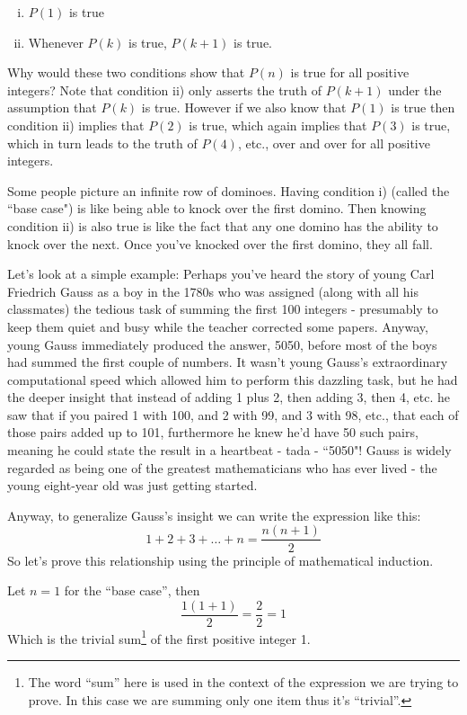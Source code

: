 \documentclass{article}
\begin{document}
\begin{enumerate}[i)]
\item $P(1)$ is true
\item Whenever $P(k)$ is true, $P(k+1)$ is true.
\end{enumerate}

Why would these two conditions show that $P(n)$ is true for all
positive integers? Note that condition ii) only asserts the truth
of $P(k+1)$ under the assumption that $P(k)$ is true.
However if we also know that $P(1)$ is true then condition ii) implies that $P(2)$ is true,
which again implies that $P(3)$ is true,
which in turn leads to the truth of $P(4)$,
etc., over and over for all positive integers.

Some people picture an infinite row of dominoes.
Having condition i) (called the ``base case") is like being
able to knock over the first domino.
Then knowing condition ii) is also true is like the
fact that any one domino has the ability to knock over the next.
Once you've knocked over the first domino,
they all fall.

Let's look at a simple example:
Perhaps you've heard the story of young Carl Friedrich Gauss
as a boy in
the 1780s who was assigned (along with all his classmates)
the tedious task of summing the first 100 integers -
presumably to keep them quiet and busy while the
teacher corrected some papers. Anyway,
young Gauss immediately produced the answer,
5050, before most of the boys had summed the first couple of numbers.
It wasn't young Gauss's extraordinary computational speed which allowed
him to perform this dazzling task,
but he had the deeper insight that instead of adding 1 plus 2,
then adding 3, then 4, etc.
he saw that if you paired 1 with 100,
and 2 with 99,
and 3 with 98,
etc.,
that each of those pairs added up to 101,
furthermore he knew he'd have 50 such pairs,
meaning he could state the result in a heartbeat - tada - ``5050"!
Gauss is widely regarded as being one of the greatest
mathematicians who has ever lived - the young eight-year old was just getting started.

\break
Anyway,
to generalize Gauss's insight we can write the expression like this:
\[1+2+3+\ldots+n=\frac{n(n+1)}{2}\]
So let's prove this relationship using the principle of mathematical induction.
\bigskip

Let $n=1$ for the ``base case'',
then
\[\frac{1(1+1)}{2}=\frac{2}{2}=1\]
Which is the trivial sum\footnote{The word ``sum'' here is used in the context of the expression we are trying to prove. In this case we are summing only one item thus it's ``trivial''.} of the first positive integer 1.
\bigskip
\end{document}
